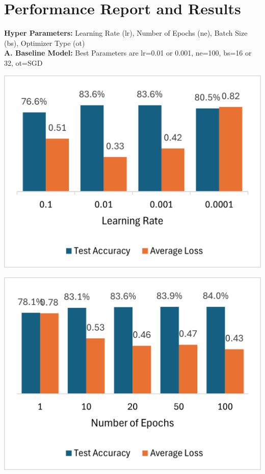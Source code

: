 \documentclass{article}
\begin{document}
\section{Performance Report and Results}
\textbf{Hyper Parameters:  }Learning Rate (lr), Number of Epochs (ne), Batch Size (bs), Optimizer Type (ot) \\
\textbf{A. Baseline Model: } Best Parameters are lr=0.01 or 0.001, ne=100, bs=16 or 32, ot=SGD

\begin{center} %
    \begin{minipage}{0.30\textwidth}
        \centering
        \includegraphics[width=\textwidth]{figure/lr.png}
    \end{minipage}
    \begin{minipage}{0.3\textwidth}
        \centering
        \includegraphics[width=\textwidth]{figure/epoch.png}

\end{minipage}
\end{center}
\end{document}
